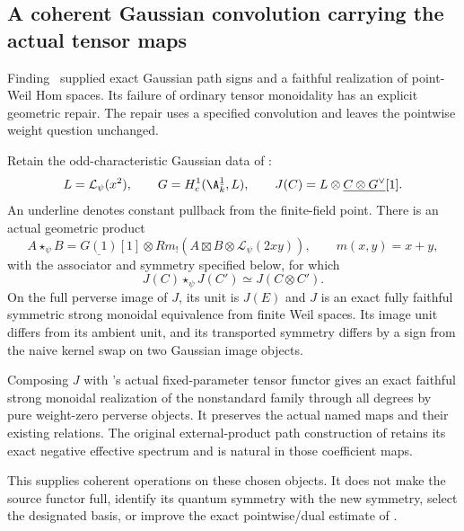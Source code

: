 \subsection{A coherent Gaussian convolution carrying the actual tensor maps}
Finding~ supplied exact Gaussian path signs and a faithful
realization of point-Weil Hom spaces. Its failure of ordinary tensor
monoidality has an explicit geometric repair. The repair uses a
specified convolution and leaves the pointwise weight question unchanged.

\begin{finding}
\label{f:gaussianconvolution}
Retain the odd-characteristic Gaussian data of :
\[
 L=\mathcal L_\psi(x^2),\qquad
 G=H_c^1(\A^1_{\bar k},L),\qquad
 J(C)=L\otimes\underline{C\otimes G^\vee}[1].
\]
An underline denotes constant pullback from the finite-field point.
There is an actual geometric product
\begin{equation}\label{eq:gaussianstar}
 A\star_\psi B=
 \underline{G(1)}[1]\otimes
 Rm_!\left(A\boxtimes B\otimes\mathcal L_\psi(2xy)\right),
 \qquad m(x,y)=x+y,
\end{equation}
with the associator and symmetry specified below, for which
\[
 J(C)\star_\psi J(C')\simeq J(C\otimes C').
\]
On the full perverse image of $J$, its unit is $J(E)$ and $J$ is
an exact fully faithful symmetric strong monoidal equivalence from
finite Weil spaces. Its image unit differs from its ambient unit,
and its transported symmetry differs by a sign from the naive
kernel swap on two Gaussian image objects.

Composing $J$ with 's actual fixed-parameter tensor
functor gives an exact faithful strong monoidal realization of the
nonstandard family through all degrees by pure weight-zero
perverse objects. It preserves the actual named maps and their
existing relations. The original external-product path construction
of  retains its exact negative effective spectrum and is
natural in those coefficient maps.

This supplies coherent operations on these chosen objects.
It does not make the source functor full, identify its quantum
symmetry with the new symmetry, select the designated basis, or
improve the exact pointwise/dual estimate of .
\end{finding}

